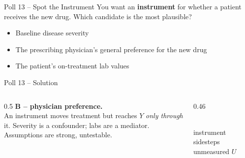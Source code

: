 \documentclass[aspectratio=169]{beamer}
\begin{document}
\begin{frame}{Poll 13 \;--\; Spot the Instrument}
  \small
  You want an \textbf{instrument} for whether a patient receives the new drug.
  Which candidate is the most plausible?
  \vspace{0.8em}

  \begin{itemize}
    \item[\textbf{A.}] Baseline disease severity
    \item[\textbf{B.}] The prescribing physician's general preference for the new drug
    \item[\textbf{C.}] The patient's on-treatment lab values
  \end{itemize}
\end{frame}

\begin{frame}{Poll 13 \;--\; Solution}
  \small
  \begin{columns}[T]
    \begin{column}{0.5\textwidth}
      \textcolor{good}{\textbf{B -- physician preference.}}\\[0.4em]
      An instrument moves treatment but reaches $Y$ \emph{only through} it.
      Severity is a confounder; labs are a mediator.\\[0.2em]
      \textcolor{brick}{Assumptions are strong, untestable.}
    \end{column}
    \begin{column}{0.46\textwidth}
      \centering
      \\[0.2em]
      {\scriptsize instrument sidesteps unmeasured $U$}
    \end{column}
  \end{columns}
\end{frame}
\end{document}
